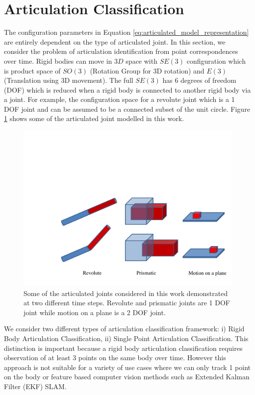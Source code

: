 \documentclass[conference]{IEEEtran}
\begin{document}
\section{Articulation Classification}\label{sec:articulation_classification} The configuration parameters in Equation \ref{eq:articulated_model_representation} are entirely dependent on the type of articulated joint.  In this section, we consider the problem of articulation identification from point correspondences over time. Rigid bodies can move in $3D$ space with $SE(3)$ configuration which is product space of $SO(3)$ (Rotation Group for 3D rotation) and $E(3)$ (Translation using 3D movement). The full $SE(3)$ has $6$ degrees of freedom (DOF) which is reduced when a rigid body is connected to another rigid body via a joint. For example, the configuration space for a revolute joint which is a 1 DOF joint and can be assumed to be a connected subset of the unit circle. Figure \ref{fig:articulation_classification} shows some of the articulated joint modelled in this work.

\begin{figure}
\includegraphics[width=1\linewidth,trim = 30mm 10mm 0mm 80mm,clip]{figures/motion_models}
\caption{Some of the articulated joints considered in this work demonstrated at two different time steps. Revolute and prismatic joints are 1 DOF joint while motion on a plane is a 2 DOF joint.}
\label{fig:articulation_classification}
\end{figure}

We consider two different types of articulation classification framework: i) Rigid Body Articulation Classification, ii) Single Point Articulation Classification. This distinction is important because a rigid body articulation classification requires observation of at least 3 points on the same body over time. However this approach is not suitable for a variety of use cases where we can only track 1 point on the body or feature based computer vision methods such as Extended Kalman Filter (EKF) SLAM.
\end{document}
